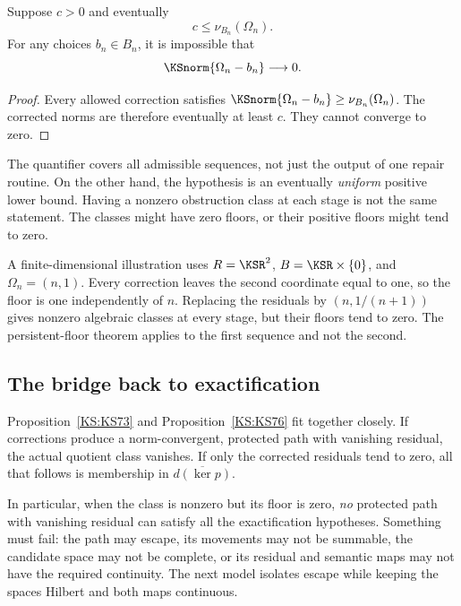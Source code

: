 \begin{KSproposition}\label{KS:KS77}
Suppose \(c>0\) and eventually
\[
 c\le\nu_{B_n}(\Omega_n).
\]
For any choices \(b_n\in B_n\), it is impossible that
\[
 \KSnorm{\Omega_n-b_n}\longrightarrow0.
\]
\end{KSproposition}
\begin{proof}
Every allowed correction satisfies
\(\KSnorm{\Omega_n-b_n}\ge\nu_{B_n}(\Omega_n)\). The corrected norms are therefore eventually at least \(c\). They cannot converge to zero.
\end{proof}
The quantifier covers all admissible sequences, not just the output of one repair routine. On the other hand, the hypothesis is an eventually \emph{uniform} positive lower bound. Having a nonzero obstruction class at each stage is not the same statement. The classes might have zero floors, or their positive floors might tend to zero.

A finite-dimensional illustration uses \(R=\KSR^2\), \(B=\KSR\times\{0\}\), and \(\Omega_n=(n,1)\). Every correction leaves the second coordinate equal to one, so the floor is one independently of \(n\). Replacing the residuals by \((n,1/(n+1))\) gives nonzero algebraic classes at every stage, but their floors tend to zero. The persistent-floor theorem applies to the first sequence and not the second.

\subsection{The bridge back to exactification}
Proposition~\ref{KS:KS73} and Proposition~\ref{KS:KS76} fit together closely. If corrections produce a norm-convergent, protected path with vanishing residual, the actual quotient class vanishes. If only the corrected residuals tend to zero, all that follows is membership in \(\overline{d(\ker p)}\).

In particular, when the class is nonzero but its floor is zero, \emph{no} protected path with vanishing residual can satisfy all the exactification hypotheses. Something must fail: the path may escape, its movements may not be summable, the candidate space may not be complete, or its residual and semantic maps may not have the required continuity. The next model isolates escape while keeping the spaces Hilbert and both maps continuous.




